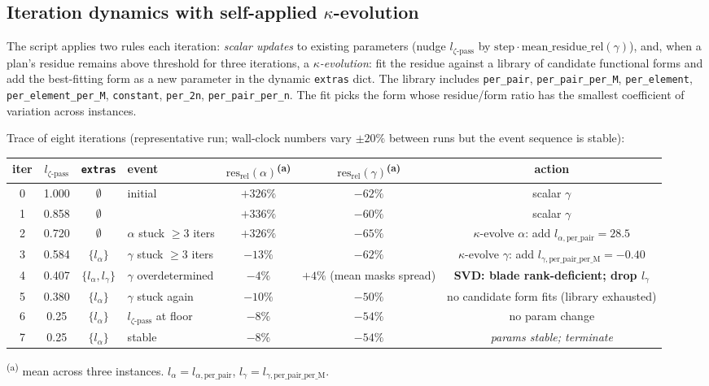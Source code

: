 \subsection{Iteration dynamics with self-applied $\kappa$-evolution}
\label{app-f:iterations}

The script applies two rules each iteration:
\emph{scalar updates} to existing parameters (nudge
$l_{\zeta\text{-pass}}$ by $\mathrm{step} \cdot
\mathrm{mean\_residue\_rel}(\gamma)$), and, when a
plan's residue remains above threshold for three
iterations, a \emph{$\kappa$-evolution}: fit the
residue against a library of candidate functional
forms and add the best-fitting form as a new
parameter in the dynamic \texttt{extras} dict. The
library includes
\verb|per_pair|, \verb|per_pair_per_M|,
\verb|per_element|, \verb|per_element_per_M|,
\verb|constant|, \verb|per_2n|, \verb|per_pair_per_n|.
The fit picks the form whose residue/form ratio has
the smallest coefficient of variation across
instances.

Trace of eight iterations (representative run;
wall-clock numbers vary $\pm 20\%$ between runs but the
event sequence is stable):

\begin{center}
\scriptsize
\begin{tabular}{c|cc|l|ccc}
iter & $l_{\zeta\text{-pass}}$ & \texttt{extras} & event & $\mathrm{res}_{\mathrm{rel}}(\alpha)$\textsuperscript{(a)} & $\mathrm{res}_{\mathrm{rel}}(\gamma)$\textsuperscript{(a)} & action \\
\hline
0 & 1.000 & $\emptyset$ & initial & $+326\%$ & $-62\%$ & scalar $\gamma$ \\
1 & 0.858 & $\emptyset$ & & $+336\%$ & $-60\%$ & scalar $\gamma$ \\
2 & 0.720 & $\emptyset$ & $\alpha$ stuck $\geq 3$ iters & $+326\%$ & $-65\%$ & $\kappa$-evolve $\alpha$: add $l_{\alpha,\mathrm{per\_pair}}=28.5$ \\
3 & 0.584 & $\{l_\alpha\}$ & $\gamma$ stuck $\geq 3$ iters & $-13\%$ & $-62\%$ & $\kappa$-evolve $\gamma$: add $l_{\gamma,\mathrm{per\_pair\_per\_M}}=-0.40$ \\
4 & 0.407 & $\{l_\alpha, l_\gamma\}$ & $\gamma$ overdetermined & $-4\%$ & $+4\%$ (mean masks spread) & \textbf{SVD: blade rank-deficient; drop $l_\gamma$} \\
5 & 0.380 & $\{l_\alpha\}$ & $\gamma$ stuck again & $-10\%$ & $-50\%$ & no candidate form fits (library exhausted) \\
6 & 0.25 & $\{l_\alpha\}$ & $l_{\zeta\text{-pass}}$ at floor & $-8\%$ & $-54\%$ & no param change \\
7 & 0.25 & $\{l_\alpha\}$ & stable & $-8\%$ & $-54\%$ & \emph{params stable; terminate} \\
\end{tabular}

\footnotesize
\textsuperscript{(a)} mean across three instances.
$l_\alpha = l_{\alpha,\mathrm{per\_pair}}$,
$l_\gamma = l_{\gamma,\mathrm{per\_pair\_per\_M}}$.
\end{center}

